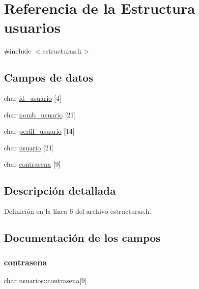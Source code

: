 \hypertarget{structusuarios}{}\section{Referencia de la Estructura usuarios}
\label{structusuarios}


{\ttfamily \#include $<$estructuras.\+h$>$}

\subsection*{Campos de datos}
\begin{DoxyCompactItemize}
\item 
char \mbox{\hyperlink{structusuarios_a5090e2f56888f1a9873bd9ed35bf46d3}{id\+\_\+usuario}} \mbox{[}4\mbox{]}
\item 
char \mbox{\hyperlink{structusuarios_acf2d33748c720f047d2a0e512e187fd5}{nomb\+\_\+usuario}} \mbox{[}21\mbox{]}
\item 
char \mbox{\hyperlink{structusuarios_afe590222f989c0e30b72bbc0014868cc}{perfil\+\_\+usuario}} \mbox{[}14\mbox{]}
\item 
char \mbox{\hyperlink{structusuarios_a3330601c31921ae73c6fa7551a68a0da}{usuario}} \mbox{[}21\mbox{]}
\item 
char \mbox{\hyperlink{structusuarios_a0689cc96bd888f121b04e5c43d47a028}{contrasena}} \mbox{[}9\mbox{]}
\end{DoxyCompactItemize}


\subsection{Descripción detallada}


Definición en la línea 6 del archivo estructuras.\+h.



\subsection{Documentación de los campos}
\mbox{\label{structusuarios_a0689cc96bd888f121b04e5c43d47a028}} 
\subsubsection{\texorpdfstring{contrasena}{contrasena}}
{\footnotesize\ttfamily char usuarios\+::contrasena\mbox{[}9\mbox{]}}



